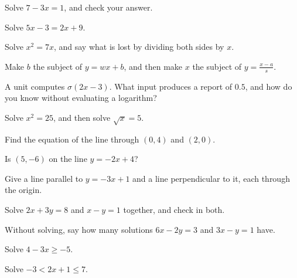 \begin{testexercises}
\item Solve $7 - 3x = 1$, and check your answer.
\item Solve $5x - 3 = 2x + 9$.
\item Solve $x^{2} = 7x$, and say what is lost by dividing both sides by $x$.
\item Make $b$ the subject of $y = wx + b$, and then make $x$ the subject of
  $y = \frac{x - a}{s}$.
\item A unit computes $\sigma(2x - 3)$. What input produces a report of
  $\num{0.5}$, and how do you know without evaluating a logarithm?
\item Solve $x^{2} = 25$, and then solve $\sqrt{x} = 5$.
\item Find the equation of the line through $(0, 4)$ and $(2, 0)$.
\item Is $(5, -6)$ on the line $y = -2x + 4$?
\item Give a line parallel to $y = -3x + 1$ and a line perpendicular to it,
  each through the origin.
\item Solve $2x + 3y = 8$ and $x - y = 1$ together, and check in both.
\item Without solving, say how many solutions $6x - 2y = 3$ and $3x - y = 1$
  have.
\item Solve $4 - 3x \ge -5$.
\item Solve $-3 < 2x + 1 \le 7$.

\end{testexercises}
